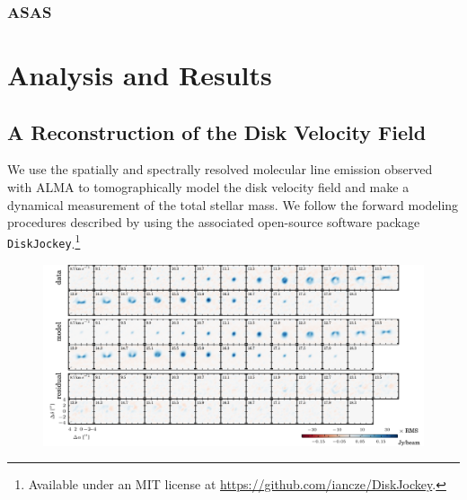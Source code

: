 \documentclass[twocolumn]{aastex61}
\begin{document}
\subsubsection{ASAS}


\section{Analysis and Results}

\subsection{A Reconstruction of the Disk Velocity Field}
We use the spatially and spectrally resolved molecular line emission observed with ALMA to tomographically model the disk velocity field and make a dynamical measurement of the total stellar mass. We follow the forward modeling procedures described by \citet{czekala15a,czekala16} using the associated open-source software package {\tt DiskJockey}.\footnote{Available under an MIT license at \url{https://github.com/iancze/DiskJockey}.}

\begin{figure}[ht!]
\begin{center}
  \includegraphics{chmaps_13CO.pdf}
  \end{center}
\end{figure}
\end{document}
